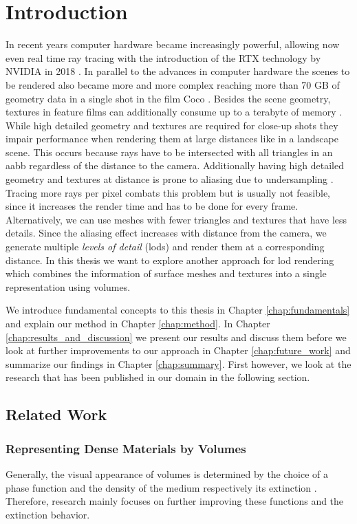 \chapter{Introduction}
\label{chap:intro}

In recent years computer hardware became increasingly powerful, allowing now even real time ray tracing with the introduction of the RTX technology by NVIDIA in 2018 \cite{turing_whitepaper}.
In parallel to the advances in computer hardware the scenes to be rendered also became more and more complex reaching more than 70 GB of geometry data in a single shot in the film Coco \cite{pixarxpu}.
Besides the scene geometry, textures in feature films can additionally consume up to a terabyte of memory \cite{arnold}.
While high detailed geometry and textures are required for close-up shots they impair performance when rendering them at large distances like in a landscape scene.
This occurs because rays have to be intersected with all triangles in an \ac{aabb} regardless of the distance to the camera.
Additionally having high detailed geometry and textures at distance is prone to aliasing due to undersampling \cite{pbr}.
Tracing more rays per pixel combats this problem but is usually not feasible, since it increases the render time and has to be done for every frame.
Alternatively, we can use meshes with fewer triangles and textures that have less details.
Since the aliasing effect increases with distance from the camera, we generate multiple \textit{levels of detail} (\acsp{lod}) and render them at a corresponding distance.
In this thesis we want to explore another approach for \acl{lod} rendering which combines the information of surface meshes and textures into a single representation using volumes.

We introduce fundamental concepts to this thesis in Chapter \ref{chap:fundamentals} and explain our method in Chapter \ref{chap:method}.
In Chapter \ref{chap:results_and_discussion} we present our results and discuss them before we look at further improvements to our approach in Chapter \ref{chap:future_work} and summarize our findings in Chapter \ref{chap:summary}.
First however, we look at the research that has been published in our domain in the following section.

\section{Related Work}
\subsection{Representing Dense Materials by Volumes}
Generally, the visual appearance of volumes is determined by the choice of a phase function and the density of the medium respectively its extinction \cite{pbr}.
Therefore, research mainly focuses on further improving these functions and the extinction behavior.


